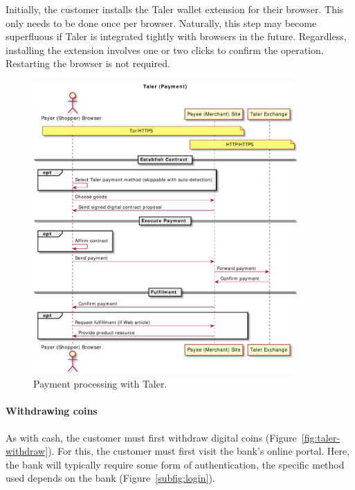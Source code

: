 \documentclass{llncs}
\begin{document}
Initially, the customer installs the Taler wallet extension
for their browser.  This only needs to be done once
per browser. Naturally, this step may become superfluous if
Taler is integrated tightly with browsers in the future.  Regardless,
installing the extension involves one or two clicks to confirm the
operation. Restarting the browser is not required.


\begin{figure}[b!]
\includegraphics[width=0.9\textwidth]{figs/taler-pay.pdf}
\caption{Payment processing with Taler.}
\label{fig:taler-pay}
\end{figure}


\paragraph{Withdrawing coins}

As with cash, the customer must first withdraw digital coins
(Figure~\ref{fig:taler-withdraw}).  For this, the customer must first
visit the bank's online portal.  Here, the bank will
typically require some form of authentication, the specific method
used depends on the bank (Figure~\ref{subfig:login}).
\end{document}
